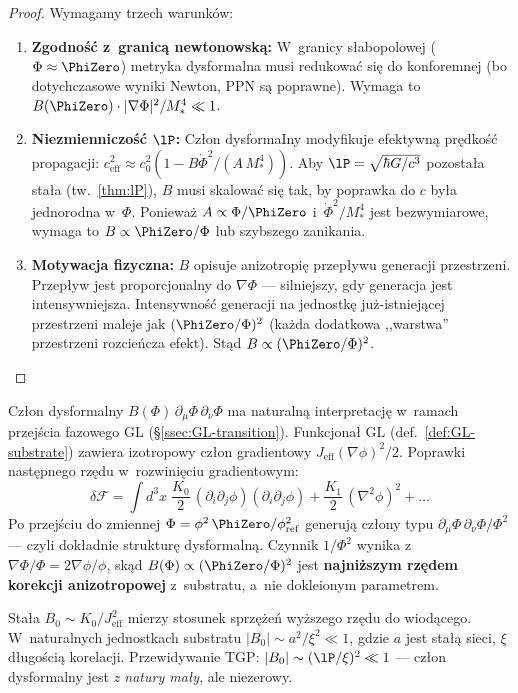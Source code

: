 \begin{proof}
Wymagamy trzech warunk\'ow:
\begin{enumerate}[nosep]
  \item \textbf{Zgodno\'s\'c z~granic\k{a} newtonowsk\k{a}:}
    W~granicy s\l{}abopolowej ($\Phi \approx \PhiZero$)
    metryka dysformalna musi redukowa\'c si\k{e} do
    konforemnej (bo dotychczasowe wyniki Newton, PPN
    s\k{a} poprawne). Wymaga to $B(\PhiZero)
    \cdot |\nabla\Phi|^2/M_*^4 \ll 1$.
  \item \textbf{Niezmienniczo\'s\'c $\lP$:}
    Cz\l{}on dysformaIny modyfikuje efektywn\k{a} pr\k{e}dko\'s\'c
    propagacji: $c_{\mathrm{eff}}^2 \approx c_0^2(1 - B\dot\Phi^2/(A\,M_*^4))$.
    Aby $\lP = \sqrt{\hbar G/c^3}$ pozosta\l{}a sta\l{}a
    (tw.~\ref{thm:lP}), $B$ musi skalowa\'c si\k{e} tak, by
    poprawka do $c$ by\l{}a jednorodna w~$\Phi$.
    Poniewa\.z $A \propto \Phi/\PhiZero$ i~$\dot\Phi^2/M_*^4$
    jest bezwymiarowe, wymaga to $B \propto \PhiZero/\Phi$
    lub szybszego zanikania.
  \item \textbf{Motywacja fizyczna:} $B$ opisuje anizotropi\k{e}
    przep\l{}ywu generacji przestrzeni. Przep\l{}yw jest
    proporcjonalny do $\nabla\Phi$ --- silniejszy, gdy
    generacja jest intensywniejsza.
    Intensywno\'s\'c generacji na jednostk\k{e} ju\.z-istniej\k{a}cej
    przestrzeni maleje jak $(\PhiZero/\Phi)^2$
    (ka\.zda dodatkowa ,,warstwa'' przestrzeni rozcie\'ncza
    efekt). St\k{a}d $B \propto (\PhiZero/\Phi)^2$.
\end{enumerate}
\end{proof}

\begin{remark}%
\label{rem:B-from-GL}
Cz\l{}on dysformalny $B(\Phi)\,\partial_\mu\Phi\,\partial_\nu\Phi$
ma naturaln\k{a} interpretacj\k{e} w~ramach przej\'scia fazowego
GL (\S\ref{ssec:GL-transition}). Funkcjona\l{} GL (def.~\ref{def:GL-substrate})
zawiera izotropowy cz\l{}on gradientowy $J_{\mathrm{eff}}(\nabla\phi)^2/2$.
Poprawki nast\k{e}pnego rz\k{e}du w~rozwini\k{e}ciu gradientowym:
\begin{equation}\label{eq:GL-next-order}
  \delta\mathcal{F}
  = \int d^3x\;\frac{K_0}{2}\,
    (\partial_i\partial_j\phi)(\partial_i\partial_j\phi)
  + \frac{K_1}{2}\,(\nabla^2\phi)^2 + \ldots
\end{equation}
Po przej\'sciu do zmiennej $\Phi = \phi^2\,\PhiZero/\phi_{\mathrm{ref}}^2$
generuj\k{a} cz\l{}ony typu
$\partial_\mu\Phi\,\partial_\nu\Phi/\Phi^2$ --- czyli
dok\l{}adnie struktur\k{e} dysformaln\k{a}. Czynnik
$1/\Phi^2$ wynika z~$\nabla\Phi/\Phi = 2\nabla\phi/\phi$,
sk\k{a}d $B(\Phi) \propto (\PhiZero/\Phi)^2$ jest
\textbf{najni\.zszym rz\k{e}dem korekcji anizotropowej}
z~substratu, a~nie dokleionym parametrem.

\noindent Sta\l{}a $B_0 \sim K_0/J_{\mathrm{eff}}^2$ mierzy
stosunek sprz\k{e}\.ze\'n wy\.zszego rz\k{e}du do wiod\k{a}cego.
W~naturalnych jednostkach substratu $|B_0| \sim a^2/\xi^2 \ll 1$,
gdzie $a$ jest sta\l{}\k{a} sieci, $\xi$ d\l{}ugo\'sci\k{a}
korelacji. Przewidywanie TGP:
$|B_0| \sim (\lP/\xi)^2 \ll 1$ --- cz\l{}on dysformalny
jest \emph{z natury ma\l{}y}, ale niezerowy.
\end{remark}

